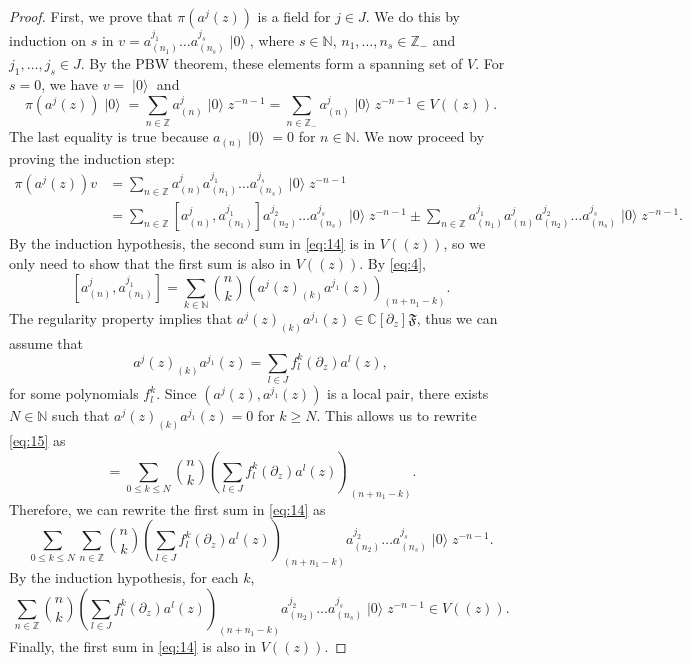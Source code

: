 \documentclass[a4paper, 12pt, reqno]{amsart}
\theoremstyle{remark}
\DeclareMathOperator{\vac}{|0\rangle}
\begin{document}
\begin{proof}
  First, we prove that $\pi(a^j(z))$ is a field for $j \in J$.
  We do this by induction on $s$ in $v = a^{j_1}_{(n_1)}\dots a^{j_s}_{(n_s)}\vac$, where $s \in \mathbb{N}$, $n_1, \dots, n_s \in \mathbb{Z}_-$ and $j_1, \dots, j_s \in J$.
  By the PBW theorem, these elements form a spanning set of $V$.
  For $s = 0$, we have $v = \vac$ and
  \begin{equation*}
    \pi(a^j(z))\vac = \sum_{n \in \mathbb{Z}}a^j_{(n)}\vac z^{-n - 1} = \sum_{n \in \mathbb{Z}_-}a^j_{(n)}\vac z^{-n - 1} \in V((z)).
  \end{equation*}
  The last equality is true because $a_{(n)}\vac = 0$ for $n \in \mathbb{N}$.
  We now proceed by proving the induction step:
  \begin{align}
    \nonumber
    \pi(a^j(z))v &= \sum_{n \in \mathbb{Z}}a^j_{(n)}a^{j_1}_{(n_1)}\dots a^{j_s}_{(n_s)}\vac z^{-n - 1} \\
    \label{eq:14}
                 &= \sum_{n \in \mathbb{Z}} [a^j_{(n)}, a^{j_1}_{(n_1)}]a^{j_2}_{(n_2)}\dots a^{j_s}_{(n_s)}\vac z^{-n - 1} \pm \sum_{n \in \mathbb{Z}}a^{j_1}_{(n_1)}a^j_{(n)}a^{j_2}_{(n_2)}\dots a^{j_s}_{(n_s)}\vac z^{-n - 1}.
  \end{align}
  By the induction hypothesis, the second sum in \eqref{eq:14} is in $V((z))$, so we only need to show that the first sum is also in $V((z))$.
  By \eqref{eq:4},
  \begin{equation}
    \label{eq:15}
    [a^j_{(n)}, a^{j_1}_{(n_1)}] = \sum_{k \in \mathbb{N}}\binom{n}{k}(a^j(z)_{(k)}a^{j_1}(z))_{(n + n_1 - k)}.
  \end{equation}
  The regularity property implies that $a^j(z)_{(k)}a^{j_1}(z) \in \mathbb{C}[\partial_z]\mathfrak{F}$, thus we can assume that
  \begin{equation*}
    a^j(z)_{(k)}a^{j_1}(z) = \sum_{l \in J}f^k_l(\partial_z)a^l(z),
  \end{equation*}
  for some polynomials $f^k_l$.
  Since $(a^j(z), a^{j_1}(z))$ is a local pair, there exists $N \in \mathbb{N}$ such that $a^j(z)_{(k)}a^{j_1}(z) = 0$ for $k \ge N$.
  This allows us to rewrite \eqref{eq:15} as
  \begin{equation*}
    [a^j_{(n)}, a^{j_1}_{(n_1)}] = \sum_{0 \le k \le N}\binom{n}{k}\left(\sum_{l \in J}f^k_l(\partial_z)a^l(z)\right)_{(n + n_1 - k)}.
  \end{equation*}
  Therefore, we can rewrite the first sum in \eqref{eq:14} as
  \begin{equation*}
    \sum_{0 \le k \le N}\sum_{n \in \mathbb{Z}}\binom{n}{k}\left(\sum_{l \in J}f^k_l(\partial_z)a^l(z)\right)_{(n + n_1 - k)}a^{j_2}_{(n_2)}\dots a^{j_s}_{(n_s)}\vac z^{-n - 1}.
  \end{equation*}
  By the induction hypothesis, for each $k$,
  \begin{equation*}
    \sum_{n \in \mathbb{Z}}\binom{n}{k}\left(\sum_{l \in J}f^k_l(\partial_z)a^l(z)\right)_{(n + n_1 - k)}a^{j_2}_{(n_2)}\dots a^{j_s}_{(n_s)}\vac z^{-n - 1} \in V((z)).
  \end{equation*}
  Finally, the first sum in \eqref{eq:14} is also in $V((z))$.


\end{proof}
\end{document}
